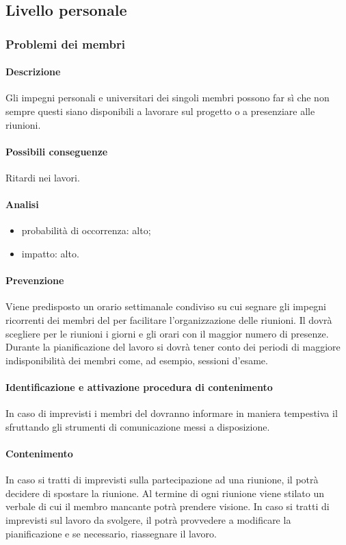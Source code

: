 	\subsection {Livello personale}
		\subsubsection {Problemi dei membri}
		\label{subsec:pbmDeiMembri}
			\paragraph{Descrizione} Gli impegni personali e universitari dei singoli membri possono far sì che non sempre questi siano disponibili a lavorare sul progetto o a presenziare alle riunioni.
			\paragraph{Possibili conseguenze} Ritardi nei lavori.
			\paragraph{Analisi}
			\begin{itemize}
			\item{probabilità di occorrenza:} alto;
			\item{impatto:} alto.
			\end{itemize}
			\paragraph{Prevenzione} Viene predisposto un orario settimanale condiviso su cui segnare gli impegni ricorrenti dei membri del  per facilitare l'organizzazione delle riunioni. Il \responsabilediprogetto{} dovrà scegliere per le riunioni i giorni e gli orari con il maggior numero di presenze. Durante la pianificazione del lavoro si dovrà tener conto dei periodi di maggiore indisponibilità dei membri come, ad esempio, sessioni d'esame.
			\paragraph{Identificazione e attivazione procedura di contenimento}
			In caso di imprevisti i membri del  dovranno informare in maniera tempestiva il \responsabilediprogetto{} sfruttando gli strumenti di comunicazione messi a disposizione.
			\paragraph{Contenimento} In caso si tratti di imprevisti sulla partecipazione ad una riunione, il \responsabilediprogetto{} potrà decidere di spostare la riunione. Al termine di ogni riunione viene stilato un verbale di cui il membro mancante potrà prendere visione. In caso si tratti di imprevisti sul lavoro da svolgere, il \responsabilediprogetto{} potrà provvedere a modificare la pianificazione e se necessario, riassegnare il lavoro.
